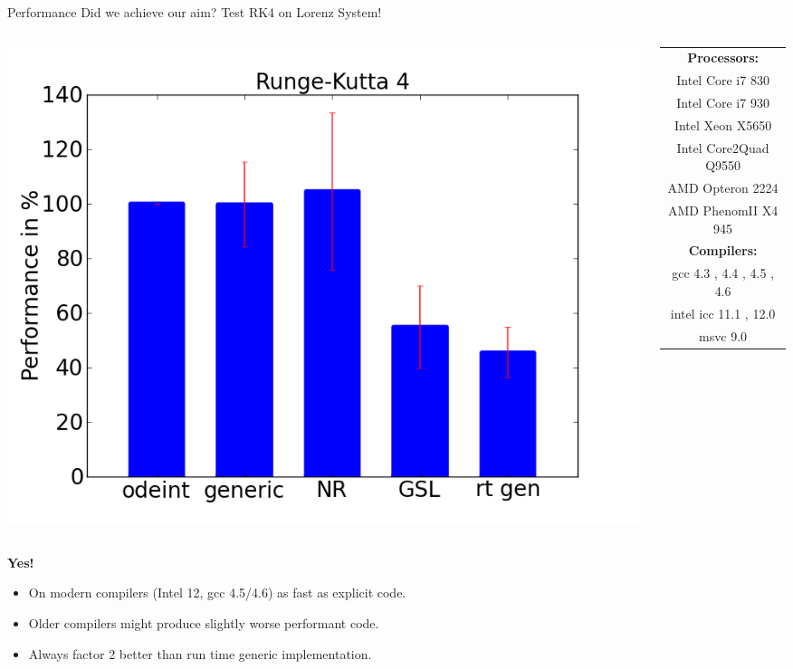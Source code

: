\documentclass{beamer}
\begin{document}
\begin{frame}{Performance}
Did we achieve our aim? Test RK4 on Lorenz System!

\pause
\begin{columns}
\begin{column}{0.55\linewidth}
\includegraphics[width=1.0\linewidth]{perf_rk4.png}
\end{column}
\begin{column}{0.4\linewidth}
\begin{scriptsize}
  \begin{tabular}[b]{c}
    \textbf{Processors:} \\
    Intel Core i7 830 \\
    Intel Core i7 930 \\
    Intel Xeon X5650 \\
    Intel Core2Quad Q9550 \\
    AMD Opteron 2224 \\
    AMD PhenomII X4 945 \\
    \hline
    \textbf{Compilers:} \\
    gcc 4.3 , 4.4 , 4.5 , 4.6 \\
    intel icc 11.1 , 12.0 \\
    msvc 9.0
  \end{tabular}               
\end{scriptsize}
\end{column}
\end{columns}

\pause
\begin{center}
\textbf{Yes!}
\end{center}
\pause%
\begin{small}
\begin{itemize}
\item On modern compilers (Intel 12, gcc 4.5/4.6) as fast as explicit code.
\item Older compilers might produce slightly worse performant code.
\item Always factor 2 better than run time generic implementation.
\end{itemize}
\end{small}

\end{frame}
\end{document}
